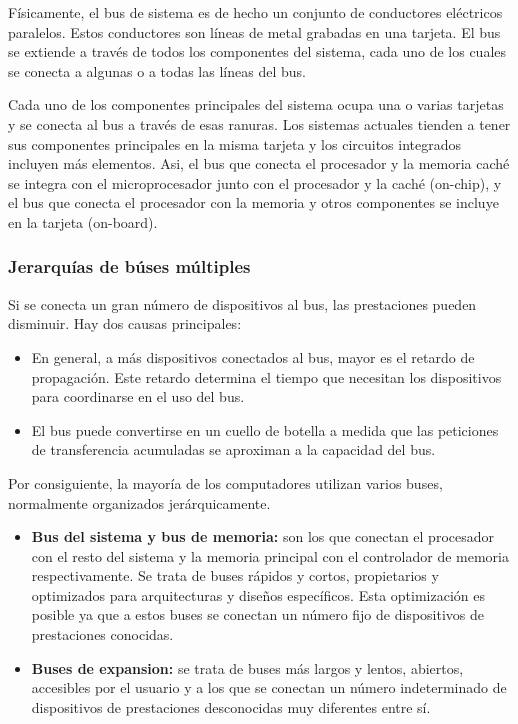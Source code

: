 Físicamente, el bus de sistema es de hecho un conjunto de conductores eléctricos paralelos. Estos conductores son líneas de metal grabadas en una tarjeta. El bus se extiende a través de todos los componentes del sistema, cada uno de los cuales se conecta a algunas o a todas las líneas del bus.

Cada uno de los componentes principales del sistema ocupa una o varias tarjetas y se conecta al bus a través de esas ranuras. Los sistemas actuales tienden a tener sus componentes principales en la misma tarjeta y los circuitos integrados incluyen más elementos. Asi, el bus que conecta el procesador y la memoria caché se integra con el microprocesador junto con el procesador y la caché (on-chip), y el bus que conecta el procesador con la memoria y otros componentes se incluye en la tarjeta (on-board).

\subsubsection{Jerarquías de búses múltiples}

Si se conecta un gran número de dispositivos al bus, las prestaciones pueden disminuir. Hay dos causas principales:

\begin{itemize}
  \item En general, a más dispositivos conectados al bus, mayor es el retardo de propagación. Este retardo determina el tiempo que necesitan los dispositivos para coordinarse en el uso del bus.
  \item El bus puede convertirse en un cuello de botella a medida que las peticiones de transferencia acumuladas se aproximan a la capacidad del bus.
\end{itemize}

Por consiguiente, la mayoría de los computadores utilizan varios buses, normalmente organizados jerárquicamente. 

\begin{itemize}
  \item \textbf{Bus del sistema y bus de memoria:} son los que conectan el procesador con el resto del sistema y la memoria principal con el controlador de memoria respectivamente. Se trata de buses rápidos y cortos, propietarios y optimizados para arquitecturas y diseños específicos. Esta optimización es posible ya que a estos buses se conectan un número fijo de dispositivos de prestaciones conocidas.
  \item \textbf{Buses de expansion:} se trata de buses más largos y lentos, abiertos, accesibles por el usuario y a los que se conectan un número indeterminado de dispositivos de prestaciones desconocidas muy diferentes entre sí.
\end{itemize}

